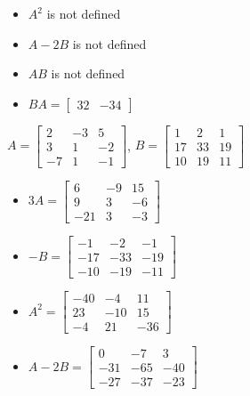 \documentclass{ximera}
\begin{document}
\begin{question}
\begin{problem}
\begin{solution}
\begin{itemize}
\item $A^2$ is not defined

\item  $A-2B$ is not defined

\item $AB$ is not defined

\item $BA = \left[ \begin{array}{rr} 32 & -34 \end{array} \right]$

\end{itemize}
\end{solution}
\end{problem}

\begin{problem}\label{easymatarithlast}
$ A = \left[ \begin{array}{rrr} 2 & -3 & 5 \\ 3 & 1 &-2 \\ -7 & 1 & -1 \end{array} \right]$, $B= \left[ \begin{array}{rrr} 1 & 2 & 1 \\ 17 & 33 & 19 \\ 10 & 19 & 11 \end{array} \right]$

\begin{solution}
\begin{itemize}
\item  $3A = \left[ \begin{array}{rrr} 6 & -9 & 15 \\ 9 & 3 &-6 \\ -21 & 3 & -3 \end{array} \right]$

\item $-B = \left[ \begin{array}{rrr} -1 & -2 & -1 \\ -17 & -33 & -19 \\ -10 & -19 & -11 \end{array} \right]$

\item  $A^2 = \left[ \begin{array}{rrr} -40 & -4 & 11 \\ 23 & -10 & 15 \\ -4 & 21 & -36 \end{array} \right]$

\item $A-2B = \left[ \begin{array}{rrr} 0 & -7 & 3 \\ -31 & -65 & -40 \\ -27 & -37 & -23 \end{array} \right]$


\end{itemize}
\end{solution}
\end{problem}
\end{question}
\end{document}
